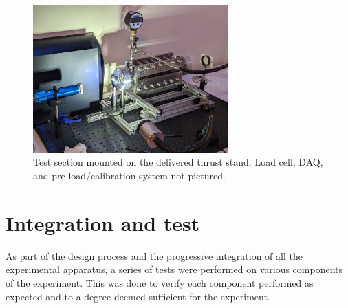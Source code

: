             \begin{figure}[h]
                \centering
                \includegraphics[trim=0 0 0 12in, clip, width=0.67\textwidth]{assets/3 design/thrust_stand.jpg}
                \caption[Test section mounted on the delivered thrust stand]{Test section mounted on the delivered thrust stand. Load cell, DAQ, and pre-load/calibration system not pictured.}
                \label{fig:thrust_stand}
            \end{figure}

    \section{Integration and test}
        As part of the design process and the progressive integration of all the experimental apparatus, a series of tests were performed on various components of the experiment. This was done to verify each component performed as expected and to a degree deemed sufficient for the experiment.
        
